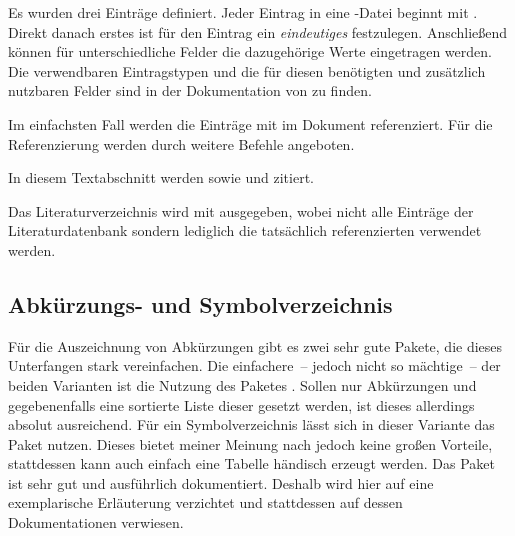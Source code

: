 \documentclass[english,ngerman]{tudscrartcl}
\begin{document}
%
Es wurden drei Einträge definiert. Jeder Eintrag in eine -Datei 
beginnt mit . Direkt danach erstes ist für den 
Eintrag ein \emph{eindeutiges}  festzulegen. Anschließend 
können für unterschiedliche Felder die dazugehörige Werte eingetragen werden. 
Die verwendbaren Eintragstypen und die für diesen benötigten und zusätzlich 
nutzbaren Felder sind in der Dokumentation von  zu finden.

Im einfachsten Fall werden die Einträge mit  im 
Dokument referenziert. Für die Referenzierung werden durch  
weitere Befehle angeboten.
%
\begin{Tutorial}
In diesem Textabschnitt werden \cite{knuth84} sowie \cite{goossens94} und 
\cite{hanisch14} zitiert.
\end{Tutorial}
%
Das Literaturverzeichnis wird mit  ausgegeben, wobei 
nicht alle Einträge der Literaturdatenbank sondern lediglich die tatsächlich 
referenzierten verwendet werden.
%
\begin{Tutorial*}
\printbibliography[heading=subbibliography]
\end{Tutorial*}
\begin{Tutorial+}
\clearpage
\end{Tutorial+}
\begin{quoting}[rightmargin=0pt]
\vspace*{-\baselineskip}
\printbibliography[heading=subbibliography]
\end{quoting}


\subsection{Abkürzungs- und Symbolverzeichnis}
\label{sec:glossaries}
Für die Auszeichnung von Abkürzungen gibt es zwei sehr gute Pakete, die dieses 
Unterfangen stark vereinfachen. Die einfachere~-- jedoch nicht so mächtige~-- 
der beiden Varianten ist die Nutzung des Paketes . Sollen nur 
Abkürzungen und gegebenenfalls eine sortierte Liste dieser gesetzt werden, ist 
dieses allerdings absolut ausreichend. Für ein Symbolverzeichnis lässt sich in 
dieser Variante das Paket  nutzen. Dieses bietet meiner 
Meinung nach jedoch keine großen Vorteile, stattdessen kann auch einfach eine 
Tabelle händisch erzeugt werden. Das Paket  ist sehr gut und 
ausführlich dokumentiert. Deshalb wird hier auf eine exemplarische Erläuterung 
verzichtet und stattdessen auf dessen Dokumentationen verwiesen.
\end{document}
